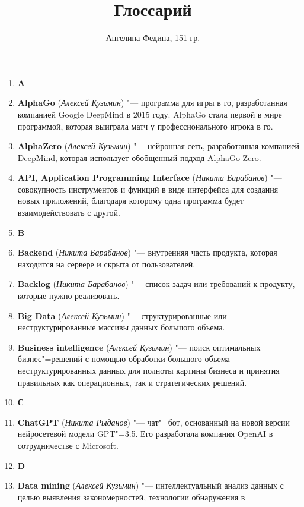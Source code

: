 \documentclass[a4paper, 14 pt]{extarticle}
\title{\textbf{Глоссарий}}
\author{Ангелина Федина, 151 гр.}
\date{}
\begin{document}
\maketitle
\thispagestyle{empty}
\pagestyle{empty}

\begin{enumerate}
    \item[] \large{\textbf{A}}
    \item \textbf{AlphaGo} (\textit{Алексей Кузьмин}) "--- программа для игры в 
    го, разработанная компанией Google DeepMind в 2015 году. AlphaGo стала 
    первой в мире программой, которая выиграла матч у профессионального игрока
    в го.
    \item \textbf{AlphaZero} (\textit{Алексей Кузьмин}) "--- нейронная сеть, 
    разработанная компанией DeepMind, которая использует обобщенный подход 
    AlphaGo Zero.
    \item \textbf{API, Application Programming Interface} 
    (\textit{Никита Барабанов}) "--- совокупность инструментов и функций в 
    виде интерфейса для создания новых приложений, благодаря которому одна 
    программа будет взаимодействовать с другой. 
    \item[] \textbf{B}
    \item \textbf{Backend} (\textit{Никита Барабанов}) "--- внутренняя часть 
    продукта, которая находится на сервере и скрыта от пользователей.
    \item \textbf{Backlog} (\textit{Никита Барабанов}) "--- список задач или 
    требований к продукту, которые нужно реализовать.
    \item \textbf{Big Data} (\textit{Алексей Кузьмин}) "--- 
    структурированные или неструктурированные массивы данных большого объема.
    \item \textbf{Business intelligence} (\textit{Алексей Кузьмин}) "--- поиск 
    оптимальных бизнес"=решений с помощью обработки большого объема 
    неструктурированных данных для полноты картины бизнеса и принятия правильных
    как операционных, так и стратегических решений.
    \item[] \textbf{С}
    \item \textbf{ChatGPT} (\textit{Никита Рыданов}) "--- чат"=бот, основанный 
    на новой версии нейросетевой модели GPT"=3.5. Его разработала компания 
    OpenAI в сотрудничестве с Microsoft.
    \item[] \textbf{D}
    \item \textbf{Data mining} (\textit{Алексей Кузьмин}) "--- интеллектуальный 
    анализ данных с целью выявления закономерностей, технологии обнаружения в 

\end{enumerate}
\end{document}
